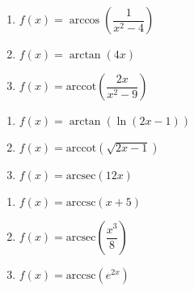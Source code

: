 \begin{multicols}{3}

\begin{enumerate}

\setcounter{enumi}{\value{HW}}

\item  $f(x) = \arccos\left(\dfrac{1}{x^2-4}\right)$
\item  $f(x) = \arctan(4x)$ 
\item  $f(x) = \text{arccot}\left(\dfrac{2x}{x^2-9}\right)$

\setcounter{HW}{\value{enumi}}

\end{enumerate}

\end{multicols}

\begin{multicols}{3}

\begin{enumerate}

\setcounter{enumi}{\value{HW}}

\item  $f(x) =\arctan(\ln(2x-1))$
\item  $f(x) = \text{arccot}(\sqrt{2x-1})$
\item  $f(x) = \text{arcsec}(12x)$

\setcounter{HW}{\value{enumi}}

\end{enumerate}

\end{multicols}

\begin{multicols}{3}

\begin{enumerate}

\setcounter{enumi}{\value{HW}}

\item  $f(x) = \text{arccsc}(x+5)$ 
\item  $f(x) = \text{arcsec}\left(\dfrac{x^3}{8}\right)$
\item  $f(x) = \text{arccsc}\left(e^{2x}\right)$  \label{domainexerlast}

\setcounter{HW}{\value{enumi}}

\end{enumerate}

\end{multicols}

